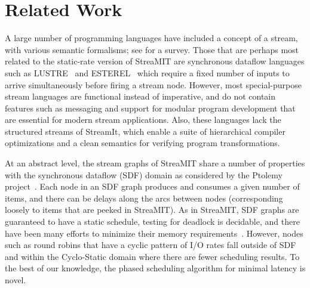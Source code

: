 \section{Related Work}
\label{sec:related}

A large number of programming languages have included a concept of a
stream, with various semantic formalisms; see \cite{survey97} for a
survey.  Those that are perhaps most related to the static-rate
version of StreaMIT are synchronous dataflow languages such as
LUSTRE~\cite{lustre} and ESTEREL~\cite{esterel92} which require a
fixed number of inputs to arrive simultaneously before firing a stream
node.  However, most special-purpose stream languages are functional
instead of imperative, and do not contain features such as messaging
and support for modular program development that are essential for
modern stream applications.  Also, these languages lack the structured
streams of StreamIt, which enable a suite of hierarchical compiler
optimizations and a clean semantics for verifying program
transformations.

At an abstract level, the stream graphs of StreaMIT share a number of
properties with the synchronous dataflow (SDF) domain as considered by
the Ptolemy project~\cite{ptolemyoverview}.  Each node in an SDF graph
produces and consumes a given number of items, and there can be delays
along the arcs between nodes (corresponding loosely to items that are
peeked in StreaMIT). As in StreaMIT, SDF graphs are guaranteed to have
a static schedule, testing for deadlock is decidable, and there have
been many efforts to minimize their memory requirements~\cite{leesdf,
murt2001x1, gov94, goddardmanaging}.  However, nodes such as round
robins that have a cyclic pattern of I/O rates fall outside of SDF and
within the Cyclo-Static domain \cite{lauwereins94geometric} where
there are fewer scheduling results.  To the best of our knowledge, the
phased scheduling algorithm for minimal latency is novel.